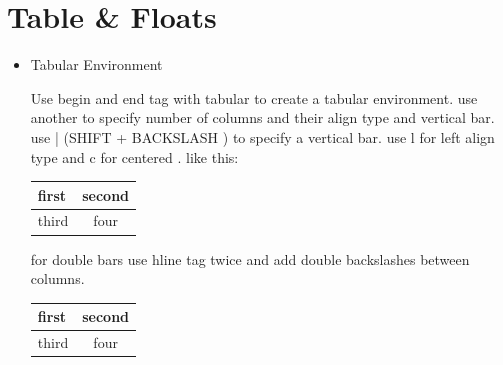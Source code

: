 \documentclass{article} %
\begin{document}
 
 
    
\section{Table \& Floats}   

\begin{itemize}
    \item Tabular Environment
    
        Use begin and end tag with {tabular} to create a tabular environment. use another {} to specify number of columns and their align type and vertical bar. use | (SHIFT + BACKSLASH ) to specify a vertical bar. use l for left align type and c for centered . like this:
    
    
    \smallskip %
    \begin{tabular}{| l | c |}
        \hline
        first & second\\
        \hline
        third & four\\
        \hline
        
    \end{tabular}
    
    \smallskip
    \noindent for double bars use hline tag twice and add double backslashes between columns. 
    
    
    
    \smallskip %
    \begin{tabular}{| l || c |}
        \hline \hline
        first & second\\
        \hline \hline
        third & four\\
        \hline \hline
        
    \end{tabular}
    
\end{itemize}
\end{document}
